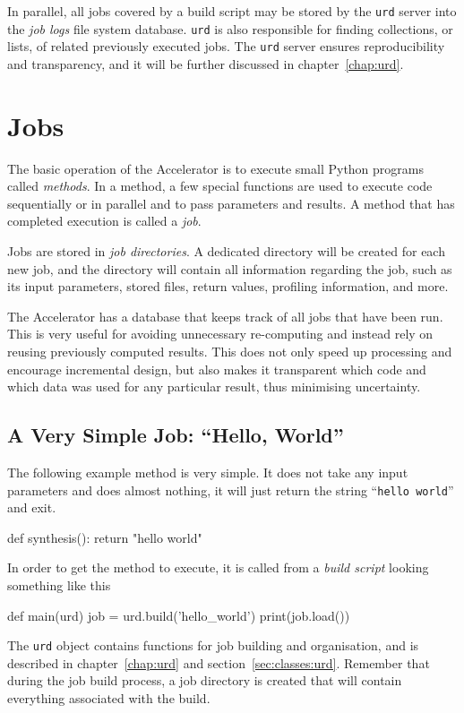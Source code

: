 In parallel, all jobs covered by a build script may be stored by the
\texttt{urd} server into the \textsl{job logs} file system database.
\texttt{urd} is also responsible for finding collections, or lists, of
related previously executed jobs.  The \texttt{urd} server ensures
reproducibility and transparency, and it will be further discussed in
chapter~\ref{chap:urd}.



\section{Jobs}
The basic operation of the Accelerator is to execute small Python
programs called \textsl{methods}.  In a method, a few special
functions are used to execute code sequentially or in parallel and to
pass parameters and results.  A method that has completed execution is
called a \textsl{job}.

Jobs are stored in \textsl{job directories}.  A dedicated directory
will be created for each new job, and the directory will contain all
information regarding the job, such as its input parameters, stored
files, return values, profiling information, and more.

The Accelerator has a database that keeps track of all jobs that have
been run.  This is very useful for avoiding unnecessary re-computing
and instead rely on reusing previously computed results.  This does
not only speed up processing and encourage incremental design, but
also makes it transparent which code and which data was used for any
particular result, thus minimising uncertainty.


\subsection{A Very Simple Job:  ``Hello, World''}
The following example method is very simple.  It does not take any
input parameters and does almost nothing, it will just return the
string ``\texttt{hello world}'' and exit.
\begin{python}
def synthesis():
    return "hello world"
\end{python}
In order to get the method to execute, it is called from a
\textsl{build script} looking something like this
\begin{python}
def main(urd)
    job = urd.build('hello_world')
    print(job.load())
\end{python}
The \texttt{urd} object contains functions for job building and
organisation, and is described in chapter~\ref{chap:urd} and
section~\ref{sec:classes:urd}.  Remember that during the job build
process, a job directory is created that will contain everything
associated with the build.

